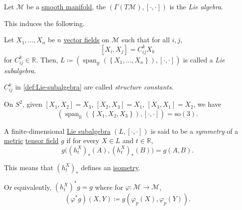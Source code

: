\begin{definition}\label{def:Lie-algebra*}
	Let \(\mathcal{M} \) be a \hyperref[def:smooth-manifold]{smooth manifold}, the \((\Gamma (T\mathcal{M} ), [\cdot, \cdot])\) is the \emph{Lie algebra}.
\end{definition}

This induces the following.

\begin{definition}\label{def:Lie-subalgebra}
	Let \(X_1, \ldots , X_n\) be \(n\) \hyperref[def:vector-field]{vector fields} on \(\mathcal{M} \) such that for all \(i, j\),
	\[
		[X_i, X_j] = C^k_{ij} X_k
	\]
	for \(C^k_{ij}\in \mathbb{R}  \). Then, \(L\coloneqq (\mathop{\mathrm{span}}_\mathbb{R} (\left\{ X_1, \ldots , X_n \right\} ), [\cdot, \cdot] )\) is called a \emph{Lie subalgebra}.
\end{definition}

\begin{notation}\label{not:structure-constant}
	\(C^k_{ij} \) in \autoref{def:Lie-subalgebra} are called \emph{structure constants}.
\end{notation}

\begin{eg}
	On \(S^2\), given \([X_1, X_2] = X_3\), \([X_2, X_3] = X_1\), \([X_3, X_1] = X_2\), we have
	\[
		\left( \mathop{\mathrm{span}}\nolimits_{\mathbb{R} }(\left\{ X_1, X_2, X_3 \right\} ), [\cdot, \cdot] \right) = \mathrm{so}(3).
	\]
\end{eg}

\begin{definition}[Symmetry]\label{def:symmetry}
	A finite-dimensional \hyperref[def:Lie-subalgebra]{Lie subalgebra} \((L, [\cdot, \cdot])\) is said to be a \emph{symmetry} of a \hyperref[def:pseudo-Riemannian-metric]{metric} \hyperref[def:tensor-field]{tensor field} \(g\) if for every \(X\in L\) and \(t\in \mathbb{R} \),
	\[
		g\big( (h^X_t )_{\ast} (A), (h^X_t )_{\ast} (B) \big) = g(A, B).
	\]
\end{definition}

This means that \((h^X_t)_{\ast} \) defines an \hyperref[def:isometry]{isometry}.

\begin{note}
	Or equivalently, \((h^X_t)^{\ast} g = g\) where for \(\varphi \colon \mathcal{M} \to \mathcal{M} \),
	\[
		(\varphi ^{\ast} g)(X, Y) \coloneqq g(\varphi _p (X), \varphi _p(Y)).
	\]
\end{note}


